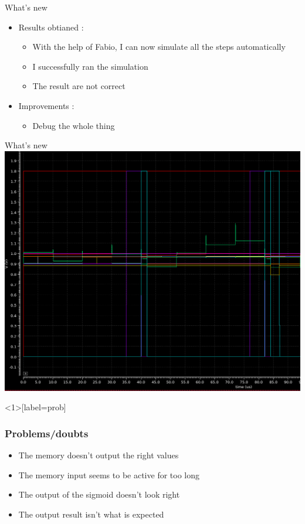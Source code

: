 \documentclass[table]{beamer}
\begin{document}
  \begin{frame}{What's new}
    \begin{itemize}
      \item Results obtianed :
        \begin{itemize}
            \color{text}
          \item With the help of Fabio, I can now simulate all the steps automatically
          \item I successfully ran the simulation
          \item The result are not correct
        \end{itemize}
      \item Improvements :
        \begin{itemize}
            \color{text}
          \item Debug the whole thing
        \end{itemize}
    \end{itemize}
  \end{frame}

  \begin{frame}{What's new}
    \includegraphics[width=\textwidth]{fulltrial1/fulltrial1-all-curves}
  \end{frame}

  \begin{frame}<1>[label=prob]
    \frametitle{Problems/doubts}
    \begin{itemize}
      \item<1-> The memory doesn't output the right values
      \item<2-> The memory input seems to be active for too long
      \item<3-> The output of the sigmoid doesn't look right
      \item<4-> The output result isn't what is expected
    \end{itemize}
  \end{frame}
\end{document}
